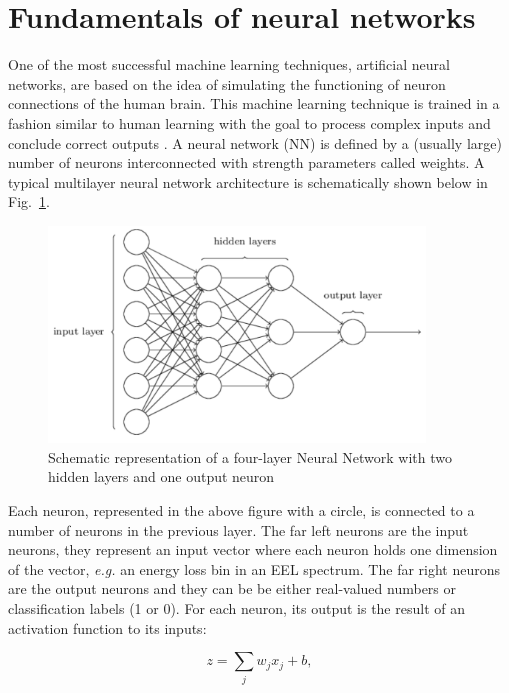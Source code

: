 \section{Fundamentals of neural networks}
\label{sec:nn}
One of the most successful machine learning techniques, 
artificial neural networks, are based on the idea of simulating 
the functioning of neuron connections of the human brain. 
%
This machine learning technique is trained in a fashion similar to 
human learning with the goal to process complex inputs and conclude correct outputs \cite{greplova}.
%
A neural network (NN) is defined by a (usually large) number of neurons 
interconnected with strength parameters called weights. 
%
A typical multilayer neural network architecture is schematically shown below in Fig.~\ref{fig:nn}.
%

\begin{figure}[H]
    \centering
    \includegraphics[width=100mm]{plots/nn.png}
    \caption{Schematic representation of a four-layer Neural Network with two hidden layers and one output neuron}
    \label{fig:nn}
\end{figure}

%
Each neuron, represented in the above figure with a circle, 
is connected to a number of neurons in the previous layer.  
%
The far left neurons are the input neurons, they represent an input vector where 
each neuron holds one dimension of the vector, {\it e.g.} an energy loss bin in an EEL spectrum. 
%
The far right neurons are the output neurons and they can be be either
real-valued numbers or classification labels (1 or 0).
%
For each neuron, its output is the result of an activation function to its inputs:

\begin{equation}
    z = \sum_j w_j x_j + b,
\end{equation}

